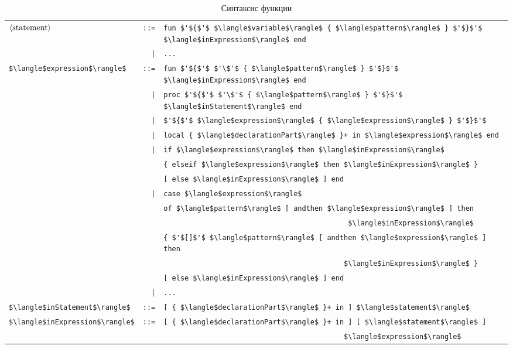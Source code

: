 \begin{table}
  \begin{tabular}{|lrl|}
    \hline
    $\langle \text{\lstinline|statement|} \rangle$ & \lstinline|::=| & \lstinline|fun $'${$'$ $\langle$variable$\rangle$ { $\langle$pattern$\rangle$ } $'$}$'$ $\langle$inExpression$\rangle$ end|\\
    & \lstinline!|!& \lstinline|...|\\
    \lstinline|$\langle$expression$\rangle$| & \lstinline|::=| & \lstinline|fun $'${$'$ $'\$'$ { $\langle$pattern$\rangle$ } $'$}$'$ $\langle$inExpression$\rangle$ end| \\
    & \lstinline!|!& \lstinline|proc $'${$'$ $'\$'$ { $\langle$pattern$\rangle$ } $'$}$'$ $\langle$inStatement$\rangle$ end| \\
    & \lstinline!|!& \lstinline|$'${$'$ $\langle$expression$\rangle$ { $\langle$expression$\rangle$ } $'$}$'$| \\
    & \lstinline!|!& \lstinline|local { $\langle$declarationPart$\rangle$ }+ in $\langle$expression$\rangle$ end| \\
    & \lstinline!|!& \lstinline|if $\langle$expression$\rangle$ then $\langle$inExpression$\rangle$| \\
    & & \lstinline|{ elseif $\langle$expression$\rangle$ then $\langle$inExpression$\rangle$ }| \\
    & & \lstinline|[ else $\langle$inExpression$\rangle$ ] end| \\
    & \lstinline!|!& \lstinline|case $\langle$expression$\rangle$| \\
    & & \lstinline|of $\langle$pattern$\rangle$ [ andthen $\langle$expression$\rangle$ ] then| \\
    & & \lstinline!                                            $\langle$inExpression$\rangle$! \\
    & & \lstinline|{ $'$[]$'$ $\langle$pattern$\rangle$ [ andthen $\langle$expression$\rangle$ ] then| \\
    & & \lstinline!                                           $\langle$inExpression$\rangle$ }! \\
    & & \lstinline|[ else $\langle$inExpression$\rangle$ ] end| \\
    & \lstinline!|!& \lstinline|...| \\
    \lstinline|$\langle$inStatement$\rangle$| & \lstinline|::=| & \lstinline|[ { $\langle$declarationPart$\rangle$ }+ in ] $\langle$statement$\rangle$| \\
    \lstinline|$\langle$inExpression$\rangle$| & \lstinline|::=| & \lstinline|[ { $\langle$declarationPart$\rangle$ }+ in ] [ $\langle$statement$\rangle$ ]| \\
    & & \lstinline!                                           $\langle$expression$\rangle$! \\
    \hline
  \end{tabular}
\caption{Синтаксис функции}
\label{table:function_syntax}
\end{table}

